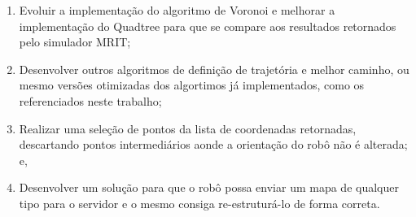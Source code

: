 \begin{enumerate}
	\item Evoluir a implementação do algoritmo de Voronoi e melhorar a implementação do Quadtree para que se compare aos resultados retornados pelo simulador MRIT;
	\item Desenvolver outros algoritmos de definição de trajetória e melhor caminho, ou mesmo versões otimizadas dos algortimos já implementados, como os referenciados neste trabalho;
	\item Realizar uma seleção de pontos da lista de coordenadas retornadas, descartando pontos intermediários aonde a orientação do robô não é alterada; e,
	\item Desenvolver um solução para que o robô possa enviar um mapa de qualquer tipo para o servidor e o mesmo consiga re-estruturá-lo de forma correta.
\end{enumerate}